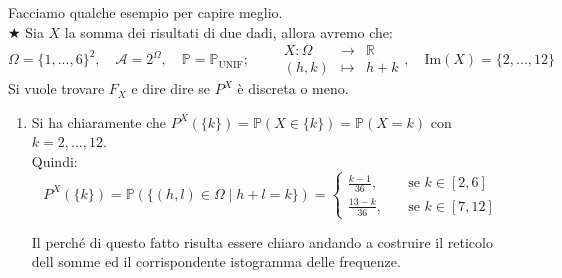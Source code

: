 \begin{esempio}
Facciamo qualche esempio per capire meglio.\\
\(\bigstar\) Sia $X$ la somma dei risultati di due dadi, allora avremo che:
\[\Omega = \{1, ..., 6\}^2,\quad \mathcal{A} = 2^\Omega, \quad \mathbb{P} = \mathbb{P}_{\text{UNIF}};\qquad
\begin{array}{rcl}
X:\Omega & \to & \mathbb{R}\\[2pt]
(h,k) & \mapsto & h + k
\end{array}
, \quad \text{Im}(X)=\{2, ..., 12\}\]
Si vuole trovare $F_X$ e dire dire se $P^X$ è discreta o meno.
\begin{enumerate}
            \item Si ha chiaramente che $P^X(\{k\}) = \mathbb{P}(X\in \{k\}) = \mathbb{P}(X=k)$ con $k=2, ..., 12$.\\
            Quindi:
            \[P^X(\{k\}) = \mathbb{P}(\{(h, l)\in \Omega \mid h+l=k\}) = \begin{cases}
                \frac{k-1}{36}, \quad &\text{se } k \in [2, 6]\\
                \frac{13-k}{36}, \quad &\text{se } k \in [7, 12]
            \end{cases}\]

        Il perché di questo fatto risulta essere chiaro andando a costruire il reticolo dell somme ed il corrispondente istogramma delle frequenze.
\begin{figure}[H]
\centering
{}
\end{figure}
\end{enumerate}
\end{esempio}
